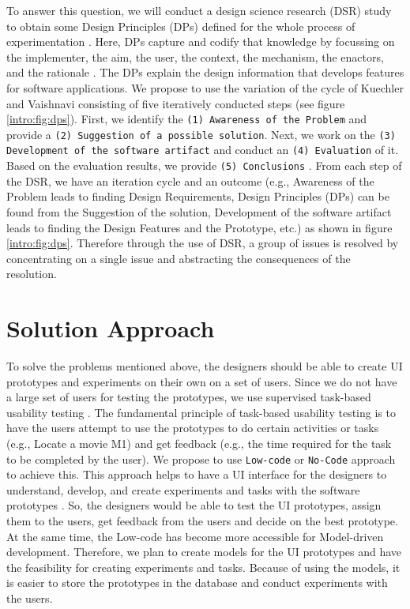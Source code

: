 To answer this question, we will conduct a design science research (DSR) study to obtain some Design Principles (DPs) defined for the whole process of experimentation \cite{paper:designprinciple:vk}. 
Here, DPs capture and codify that knowledge by focussing on the implementer, the aim, the user, the context, the mechanism, the enactors, and the rationale \cite{paper:designprinciple:gregor}. 
The DPs explain the design information that develops features for software applications.
We propose to use the variation of the cycle of Kuechler and Vaishnavi \cite{paper:designprinciple:vk} consisting of five iteratively conducted steps (see figure \ref{intro:fig:dps}). 
First, we identify the 
\texttt{(1) Awareness of the Problem} and provide a
\texttt{(2) Suggestion of a possible solution}. Next, we work on the 
\texttt{(3) Development of the software artifact} and conduct an 
\texttt{(4) Evaluation} of it. Based on the evaluation results, we provide 
\texttt{(5) Conclusions} \cite{misc:crowdsourcing:sg}.
From each step of the DSR, we have an iteration cycle and an outcome (e.g., Awareness of the Problem leads to finding Design Requirements, Design Principles (DPs) can be found from the Suggestion of the solution, Development of the software artifact leads to finding the Design Features and the Prototype, etc.) as shown in figure \ref{intro:fig:dps}.
Therefore through the use of DSR, a group of issues is resolved by concentrating on a single issue and abstracting the consequences of the resolution.


\section{Solution Approach}
\label{intro:section:solution}
To solve the problems mentioned above, the designers should be able to create UI prototypes and experiments on their own on a set of users.
Since we do not have a large set of users for testing the prototypes, we use supervised task-based usability testing \cite{article:dataanalysis:supervisedtest}.
The fundamental principle of task-based usability testing is to have the users attempt to use the prototypes to do certain activities or tasks (e.g., Locate a movie M1) and get feedback (e.g., the time required for the task to be completed by the user).
We propose to use \texttt{Low-code} or \texttt{No-Code} approach to achieve this.
This approach helps to have a UI interface for the designers to understand, develop, and create experiments and tasks with the software prototypes \cite{paper:lowcode:khorram}.
So, the designers would be able to test the UI prototypes, assign them to the users, get feedback from the users and decide on the best prototype.
At the same time, the Low-code has become more accessible for Model-driven development.
Therefore, we plan to create models for the UI prototypes and have the feasibility for creating experiments and tasks. 
Because of using the models, it is easier to store the prototypes in the database and conduct experiments with the users. 

